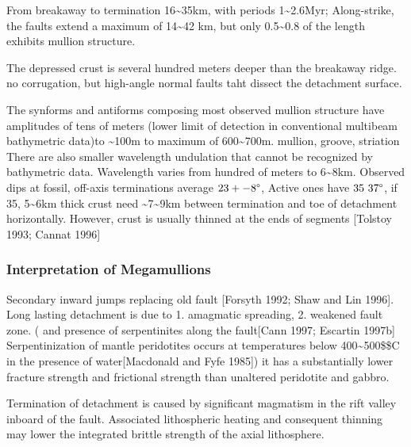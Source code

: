 \documentclass[11pt]{article}
\begin{document}
From breakaway to termination 16\textasciitilde{}35km, with periods 1\textasciitilde{}2.6Myr; Along-strike, the faults extend a maximum of 14\textasciitilde{}42 km, but only 0.5\textasciitilde{}0.8 of the length exhibits mullion structure.

The depressed crust is several hundred meters deeper than the breakaway ridge. no corrugation, but high-angle normal faults taht dissect the detachment surface.

The synforms and antiforms composing most observed mullion structure have amplitudes of tens of meters (lower limit of detection in conventional multibeam bathymetric data)to \textasciitilde{}100m to maximum of 600\textasciitilde{}700m.
mullion, groove, striation
There are also smaller wavelength undulation that cannot be recognized by bathymetric data. Wavelength varies from hundred of meters to 6\textasciitilde{}8km.
Observed dips at fossil, off-axis terminations average $23+-8\degree$, Active ones have $35~37\degree$, if 35, 5\textasciitilde{}6km thick crust need \textasciitilde{}7\textasciitilde{}9km between termination and toe of detachment horizontally. However, crust is usually thinned at the ends of segments [Tolstoy 1993; Cannat 1996]
\subsubsection{Interpretation of Megamullions}
\label{sec-1-2-4}
Secondary inward jumps replacing old fault [Forsyth 1992; Shaw and Lin 1996].
Long lasting detachment is due to 1. amagmatic spreading, 2. weakened fault zone. ( and presence of serpentinites along the fault[Cann 1997; Escartin 1997b] Serpentinization of mantle peridotites occurs at temperatures below 400\textasciitilde{}500\$\degree\$C in the presence of water[Macdonald and Fyfe 1985]) it has a substantially lower fracture strength and frictional strength than unaltered peridotite and gabbro.  

Termination of detachment is caused by significant magmatism in the rift valley inboard of the fault. Associated lithospheric heating and consequent thinning may lower the integrated brittle strength of the axial lithosphere.
\end{document}
